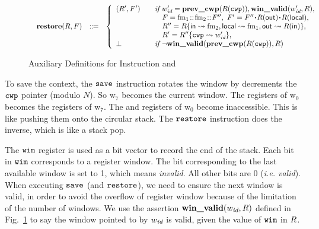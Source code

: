 \begin{figure}[!t]
\[\begin{array}{l}
\begin{array}{lcl}
            \incwin(\RFile, \Wstack) & \define &
            \left\{
            \begin{array}{ll}
                (\RFile', \Wstack')
                & \quad \textit{if }
                             \cwp' = \postcwp(\RFile(\regcwp)),
                             \winvalid(\cwp', \RFile), \\
                & \quad \ \ \
                             \Wstack = \fm_1 \stCons \fm_2 \stCons \Wstack''  , \
                              \Wstack' = \Wstack''\lstApp \RFile(\outRN)
                                                  \lstApp \RFile(\localRN), \\
                & \quad \ \ \ \RFile'' =
                \RFile\{\inRN\rightsquigarrow \fm_2,
                        \localRN\rightsquigarrow \fm_1,
                        \outRN \rightsquigarrow \RFile(\inRN)\},
                \\
                 & \quad \ \ \
                            \RFile' = \fsubst{\RFile''}\regcwp{\cwp'},
                 \\
                \perp &\quad \textit{if }
                                  \lnot\winvalid(\postcwp(R(\regcwp)), \RFile)
            \end{array}
            \right.
        \end{array}
    \end{array}
    \]
    \caption{Auxiliary Definitions for Instruction \csave{} and \crestore}
    \label{fig:save and restore}
\end{figure}

To save the context, the $\texttt{save}$ instruction
rotates the window by decrements the $\texttt{cwp}$ pointer
(modulo $N$).
So $\text{w}_7$ becomes the current window. The \outRN{}
registers of $\text{w}_0$ becomes
the \inRN{} registers of $\text{w}_7$.
The \inRN{} and \localRN{} registers of $\text{w}_0$
become inaccessible.
This is like pushing them
onto the circular stack.
The $\texttt{restore}$ instruction does the inverse, which is like
a stack pop.

The $\texttt{wim}$ register is used as a bit vector to record the
end of the stack. Each bit in $\texttt{wim}$ corresponds to a
register window. The bit corresponding to the last available
window is set to 1, which means {\em invalid}. All other bits
are 0 ({\em i.e. valid}).
When executing $\texttt{save}$ (and $\texttt{restore}$), we need to ensure
the next window is valid, in order to avoid the overflow 
of register window because of the limitation of the number 
of windows. We use the assertion $\textbf{win\_valid}{(}w_{\textit{id}}, R)$ defined
in Fig.~\ref{fig:save and restore} to say the
window pointed to by $w_{\textit{id}}$ is valid, given the value of
$\texttt{wim}$ in $R$.

